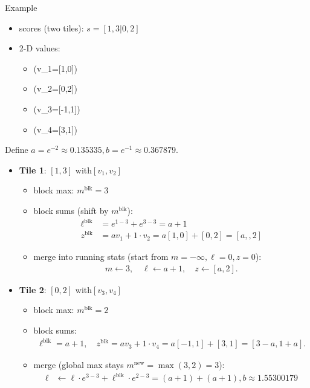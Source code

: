 \begin{commentbox}{Example}
\begin{itemize}
	\item scores (two tiles): $s=[1,3|0,2]$
	\item 2-D values:
		\begin{itemize}
		  \item (v_1=[1,0])
		  \item (v_2=[0,2])
		  \item (v_3=[-1,1])
		  \item (v_4=[3,1])
		\end{itemize}
\end{itemize}
Define $a=e^{-2}\approx0.135335, b=e^{-1}\approx0.367879$.

\begin{itemize}
	\item \textbf{Tile 1}: $[1,3]$ with$[v_1,v_2]$ 
		\begin{itemize}
			\item block max: $m^{\text{blk}}=3$ 
			\item block sums (shift by $m^{\text{blk}}$):
				\begin{align*}
					\ell^{\text{blk}} &= e^{1-3}+e^{3-3} = a+1\\
					z^{\text{blk}} &= av_1 + 1\cdot v_2
					  = a[1,0]+[0,2] = [a,,2]
				\end{align*}
			\item merge into running stats (start from $m=-\infty,\ell=0,z=0$):
				\begin{align*}
					  m\leftarrow 3,\quad \ell\leftarrow a+1,\quad z\leftarrow [a,2].
				\end{align*}
		\end{itemize}
	\item \textbf{Tile 2}: $[0,2]$ with$[v_3,v_4]$ 
		\begin{itemize}
			\item block max: $m^{\text{blk}}=2$ 
			\item block sums:
				\begin{align*}
				  \ell^{\text{blk}}=a+1,\quad
				  z^{\text{blk}}=av_3+1\cdot v_4
				  = a[-1,1]+[3,1] = [3-a,1+a].
				\end{align*}
			\item merge (global max stays $m^{\text{new}}=\max(3,2)=3$):
				\begin{align*}
					\ell &\leftarrow \ell\cdot e^{3-3} + \ell^{\text{blk}}\cdot
					e^{2-3} = (a+1) + (a+1),b \approx \boxed{1.55300179}\\

\end{align*}
\end{itemize}
\end{itemize}
\end{commentbox}

